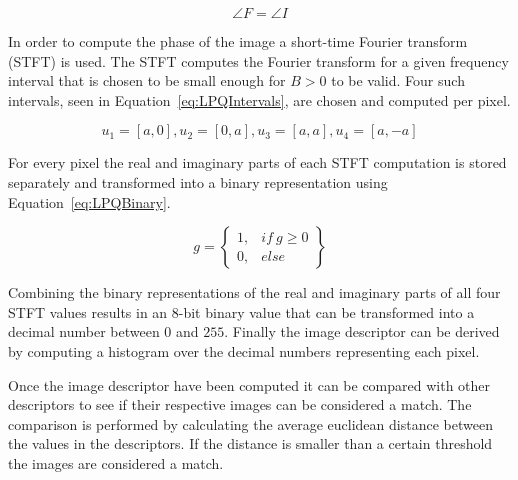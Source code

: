 \begin{equation}
  \angle F = \angle I
\label{eq:PSFFTFinal}
\end{equation}

In order to compute the phase of the image a short-time Fourier transform (STFT) is used. The STFT computes the Fourier transform for a given frequency interval that is chosen to be small enough for \(B > 0\) to be valid. Four such intervals, seen in Equation~\ref{eq:LPQIntervals}, are chosen and computed per pixel.

\begin{equation}
  u_{1} = \left [ a, 0 \right ], u_{2} = \left [ 0, a \right ], u_{3} = \left [ a, a \right ], u_{4} = \left [ a, -a \right ]
\label{eq:LPQIntervals}
\end{equation}

For every pixel the real and imaginary parts of each STFT computation is stored separately and transformed into a binary representation using Equation~\ref{eq:LPQBinary}.

\begin{equation}
  g = \begin{Bmatrix}
   1, & if\ g \geq 0\\
   0, & else
  \end{Bmatrix}
\label{eq:LPQBinary}
\end{equation}

Combining the binary representations of the real and imaginary parts of all four STFT values results in an 8-bit binary value that can be transformed into a decimal number between \(0\) and \(255\). Finally the image descriptor can be derived by computing a histogram over the decimal numbers representing each pixel.

Once the image descriptor have been computed it can be compared with other descriptors to see if their respective images can be considered a match. The comparison is performed by calculating the average euclidean distance between the values in the descriptors. If the distance is smaller than a certain threshold the images are considered a match.
